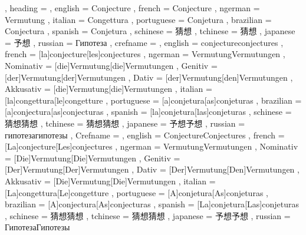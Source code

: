   {
    , heading =   {
                    , english     = Conjecture
                    , french      = Conjecture
                    , ngerman     = Vermutung
                    , italian     = Congettura
                    , portuguese  = Conjetura
                    , brazilian   = Conjectura
                    , spanish     = Conjetura
                    , schinese    = 猜想
                    , tchinese    = 猜想
                    , japanese    = 予想
                    , russian     = Гипотеза
                  }
    , crefname =  {
                    , english     = {conjecture}{conjectures}
                    , french      = [la]{conjecture}[les]{conjectures}
                    , ngerman     = { {Vermutung}{Vermutungen}
                                      , Nominativ = [die]{Vermutung}[die]{Vermutungen}
                                      , Genitiv   = [der]{Vermutung}[der]{Vermutungen}
                                      , Dativ     = [der]{Vermutung}[den]{Vermutungen}
                                      , Akkusativ = [die]{Vermutung}[die]{Vermutungen}
                                    }
                    , italian     = [la]{congettura}[le]{congetture}
                    , portuguese  = [a]{conjetura}[as]{conjeturas}
                    , brazilian   = [a]{conjectura}[as]{conjecturas}
                    , spanish     = [la]{conjetura}[las]{conjeturas}
                    , schinese    = {猜想}{猜想}
                    , tchinese    = {猜想}{猜想}
                    , japanese    = {予想}{予想}
                    , russian     = {гипотеза}{гипотезы}
                  }
    , Crefname =  {
                    , english     = {Conjecture}{Conjectures}
                    , french      = [La]{conjecture}[Les]{conjectures}
                    , ngerman     = { {Vermutung}{Vermutungen}
                                      , Nominativ = [Die]{Vermutung}[Die]{Vermutungen}
                                      , Genitiv   = [Der]{Vermutung}[Der]{Vermutungen}
                                      , Dativ     = [Der]{Vermutung}[Den]{Vermutungen}
                                      , Akkusativ = [Die]{Vermutung}[Die]{Vermutungen}
                                    }
                    , italian     = [La]{congettura}[Le]{congetture}
                    , portuguese  = [A]{conjetura}[As]{conjeturas}
                    , brazilian   = [A]{conjectura}[As]{conjecturas}
                    , spanish     = [La]{conjetura}[Las]{conjeturas}
                    , schinese    = {猜想}{猜想}
                    , tchinese    = {猜想}{猜想}
                    , japanese    = {予想}{予想}
                    , russian     = {Гипотеза}{Гипотезы}
                  }
  }

